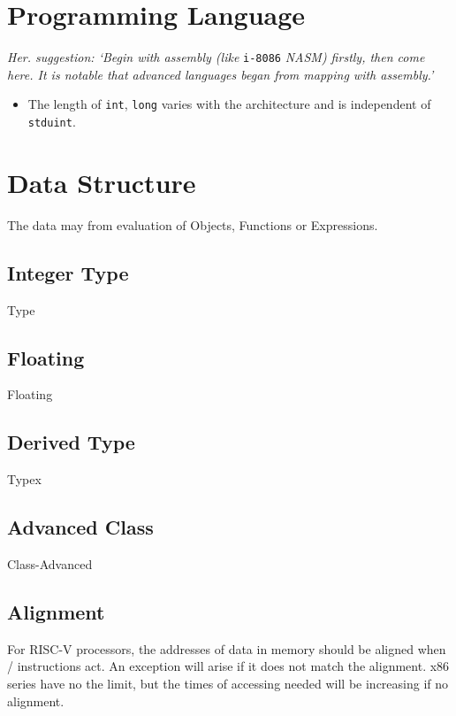 
\section{Programming Language}

\textit{Her. suggestion: `Begin with assembly (like} \verb|i-8086| \textit{NASM) firstly, then come here. It is notable that advanced languages began from mapping with assembly.'}

\begin{itemize}
	\item The length of \verb`int`, \verb`long` varies with the architecture
		and is independent of \verb`stduint`.
\end{itemize}



\section{Data Structure}

The data may from evaluation of Objects, Functions or Expressions.

\subsection{Integer Type}
{Type}

\subsection{Floating}
{Floating}

\subsection{Derived Type}
{Typex}

\subsection{Advanced Class}
{Class-Advanced}

\subsection{Alignment}

For RISC-V processors, the addresses of data in memory should be aligned when / instructions act. An exception will arise if it does not match the alignment.
x86 series have no the limit, but the times of accessing needed will be increasing if no alignment.

